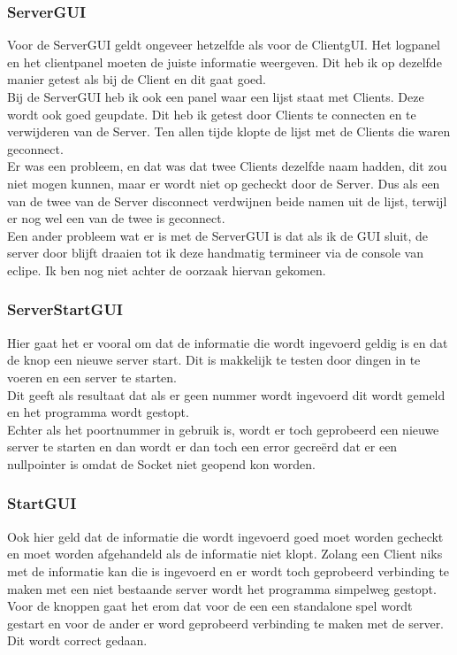 \documentclass[12pt]{article}
\begin{document}
\subsubsection{ServerGUI}
Voor de ServerGUI geldt ongeveer hetzelfde als voor de ClientgUI. Het logpanel en het clientpanel moeten de juiste informatie weergeven. Dit heb ik op dezelfde manier getest als bij de Client en dit gaat goed.\\
Bij de ServerGUI heb ik ook een panel waar een lijst staat met Clients. Deze wordt ook goed geupdate. Dit heb ik getest door Clients te connecten en te verwijderen van de Server. Ten allen tijde klopte de lijst met de Clients die waren geconnect.\\
Er was een probleem, en dat was dat twee Clients dezelfde naam hadden, dit zou niet mogen kunnen, maar er wordt niet op gecheckt door de Server. Dus als een van de twee van de Server disconnect verdwijnen beide namen uit de lijst, terwijl er nog wel een van de twee is geconnect.\\
Een ander probleem wat er is met de ServerGUI is dat als ik de GUI sluit, de server door blijft draaien tot ik deze handmatig termineer via de console van eclipe. Ik ben nog niet achter de oorzaak hiervan gekomen.
\subsubsection{ServerStartGUI}
Hier gaat het er vooral om dat de informatie die wordt ingevoerd geldig is en dat de knop een nieuwe server start. Dit is makkelijk te testen door dingen in te voeren en een server te starten.\\
Dit geeft als resultaat dat als er geen nummer wordt ingevoerd dit wordt gemeld en het programma wordt gestopt.\\
Echter als het poortnummer in gebruik is, wordt er toch geprobeerd een nieuwe server te starten en dan wordt er dan toch een error gecre\"erd dat er een nullpointer is omdat de Socket niet geopend kon worden.
\subsubsection{StartGUI}
Ook hier geld dat de informatie die wordt ingevoerd goed moet worden gecheckt en moet worden afgehandeld als de informatie niet klopt. Zolang een Client niks met de informatie kan die is ingevoerd en er wordt toch geprobeerd verbinding te maken met een niet bestaande server wordt het programma simpelweg gestopt.\\
Voor de knoppen gaat het erom dat voor de een een standalone spel wordt gestart en voor de ander er word geprobeerd verbinding te maken met de server. Dit wordt correct gedaan.
\end{document}
